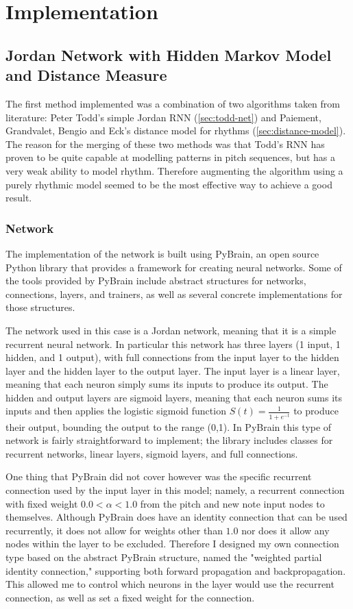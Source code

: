 \documentclass[ author={Stephen Livermore-Tozer},
				supervisor={Dr. Peter Flach},
				degree={MEng},
				title={Algorithmic Co-composition Using Machine Learning},
				subtitle={},
				type={research},
				year={2016} ]{dissertation}
\begin{document}
	\section{Implementation}
	
	\subsection{Jordan Network with Hidden Markov Model and Distance Measure}
	\label{sec:jordan-implementation}
	
	The first method implemented was a combination of two algorithms taken from literature: Peter Todd's simple Jordan RNN (\ref{sec:todd-net}) and Paiement, Grandvalet, Bengio and Eck's distance model for rhythms (\ref{sec:distance-model}). The reason for the merging of these two methods was that Todd's RNN has proven to be quite capable at modelling patterns in pitch sequences, but has a very weak ability to model rhythm. Therefore augmenting the algorithm using a purely rhythmic model seemed to be the most effective way to achieve a good result.
	
	\subsubsection{Network}
	
	The implementation of the network is built using PyBrain, an open source Python library that provides a framework for creating neural networks. Some of the tools provided by PyBrain include abstract structures for networks, connections, layers, and trainers, as well as several concrete implementations for those structures.
	
	The network used in this case is a Jordan network, meaning that it is a simple recurrent neural network. In particular this network has three layers (1 input, 1 hidden, and 1 output), with full connections from the input layer to the hidden layer and the hidden layer to the output layer. The input layer is a linear layer, meaning that each neuron simply sums its inputs to produce its output. The hidden and output layers are sigmoid layers, meaning that each neuron sums its inputs and then applies the logistic sigmoid function $ S(t) = \frac{1}{1 + e^{-t}} $ to produce their output, bounding the output to the range (0,1).
	In PyBrain this type of network is fairly straightforward to implement; the library includes classes for recurrent networks, linear layers, sigmoid layers, and full connections.
	
	One thing that PyBrain did not cover however was the specific recurrent connection used by the input layer in this model; namely, a recurrent connection with fixed weight $0.0 < \alpha < 1.0$ from the pitch and new note input nodes to themselves. Although PyBrain does have an identity connection that can be used recurrently, it does not allow for weights other than $1.0$ nor does it allow any nodes within the layer to be excluded. Therefore I designed my own connection type based on the abstract PyBrain structure, named the "weighted partial identity connection," supporting both forward propagation and backpropagation. This allowed me to control which neurons in the layer would use the recurrent connection, as well as set a fixed weight for the connection.
	
\end{document}
